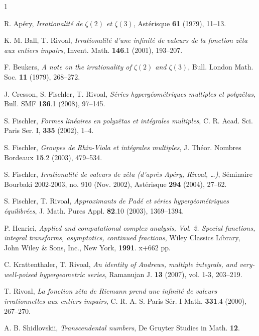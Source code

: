 \documentclass[reqno,12pt]{amsart}
\numberwithin{equation}{section}
\theoremstyle{remark}
\begin{document}
\begin{thebibliography}{1}\label{sec:biblio}

 R. Ap\'ery, {\em Irrationalit\'e de $\zeta(2)$ et $\zeta (3)$},  
Ast\'erisque {\bf 61} (1979), 11--13.

 K. M. Ball, T. Rivoal, {\em Irrationalit\'e 
d'une infinit\'e de valeurs de la fonction z\^eta aux entiers impairs}, 
Invent. Math. {\bf 146}.1 (2001), 193--207.

 F. Beukers, {\em 
A note on the irrationality of $\zeta(2)$ and $\zeta(3)$}, Bull. London Math. Soc. {\bf 11} (1979),
268--272.

 J. Cresson, S. Fischler, T. Rivoal, 
{\em S\'eries hyperg\'eom\'etriques multiples et polyz\^etas}, Bull. SMF {\bf 136}.1 (2008), 97--145.

 S. Fischler, {\em Formes lin\'eaires en polyz\^etas et int\'egrales multiples}, 
C. R. Acad. Sci. Paris  Ser. I, {\bf 335} (2002), 1--4.

 S. Fischler, {\em 
Groupes de Rhin-Viola et int\'egrales multiples}, J. Th\'eor. Nombres Bordeaux {\bf 15}.2 (2003), 479--534.

 S. Fischler, {\em Irrationalit\'e de valeurs de z\^eta (d'apr\`es Ap\'ery, Rivoal, \ldots)}, 
S\'eminaire Bourbaki 2002-2003, 
no. 910 (Nov.  2002), Ast\'erisque {\bf 294} (2004), 27--62.

  S. Fischler, T. Rivoal, {\em Approximants de Pad\'e et 
s\'eries hyperg\'eom\'etriques \'equilibr\'ees},  J. Math. Pures  Appl. {\bf 82}.10 (2003), 1369--1394.

 P. Henrici, {\em Applied and computational complex analysis, 
Vol. 2. Special functions, integral transforms, asymptotics, continued fractions}, 
Wiley Classics Library, John Wiley \& Sons, Inc., New York, {\bf 1991}. x+662 pp.


 C. Krattenthaler, T. Rivoal, {\em An identity of Andrews, multiple integrals, and very-well-poised
hypergeometric series}, Ramanujan J. {\bf 13} (2007), vol. 1-3, 203--219.

  T. Rivoal, {\em La fonction z\^eta de Riemann prend une infinit\'e
de valeurs irrationnelles aux entiers impairs}, C. R. A. S. Paris S\'er. I Math. {\bf 331}.4 (2000), 267--270.

 A. B. Shidlovskii, {\em Transcendental numbers}, De Gruyter Studies in Math. {\bf 12}.


\end{thebibliography}
\end{document}
